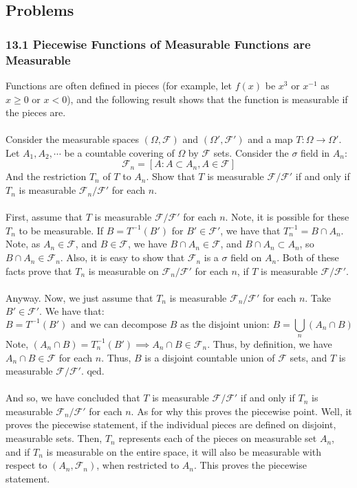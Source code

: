 \documentclass[12pt,a4paper]{article}
\newcommand{\1}[1]{\mathbbm{1}\left\{ #1 \right\}}
\newcommand{\fcal}{\mathcal{F}}
\begin{document}
\subsection{Problems}
\subsubsection{13.1 Piecewise Functions of Measurable Functions are Measurable} Functions are often defined in pieces (for example, let $f(x)$ be $x^3$ or $x^{-1}$ as $x \geq 0$ or $x < 0$), and the following result shows that the function is measurable if the pieces are.
\\\\
Consider the measurable spaces $(\Omega,\fcal)$ and $(\Omega',\fcal')$ and a map $T: \Omega \to \Omega'$. Let $A_1, A_2, \cdots$ be a countable covering of $\Omega$ by $\fcal$ sets. Consider the $\sigma$ field in $A_n$:
$$
	\fcal_n = \left[A : A \subset A_n, A \in \fcal\right]
$$
And the restriction $T_n$ of $T$ to $A_n$. Show that $T$ is measurable $\fcal/\fcal'$ if and only if $T_n$ is measurable $\fcal_n/\fcal'$ for each $n$.
\\\\
First, assume that $T$ is measurable $\fcal/\fcal'$ for each $n$. Note, it is possible for these $T_n$ to be measurable. If $B = T^{-1}(B')$ for $B' \in \fcal'$, we have that $T_n^{-1} = B \cap A_n$. Note, as $A_n \in \fcal$, and $B \in \fcal$, we have $B \cap A_n \in \fcal$, and $B \cap A_n \subset A_n$, so $B \cap A_n \in \fcal_n$. Also, it is easy to show that $\fcal_n$ is a $\sigma$ field on $A_n$. Both of these facts prove that $T_n$ is measurable on $\fcal_n/\fcal'$ for each $n$, if $T$ is measurable $\fcal/\fcal'$. 
\\\\
Anyway. Now, we just assume that $T_n$ is measurable $\fcal_n/\fcal'$ for each $n$. Take $B' \in \fcal'$. We have that:
$$
	B = T^{-1}(B') \text{ and we can decompose $B$ as the disjoint union: }
	B = \bigcup_n (A_n \cap B)
$$
Note, $(A_n \cap B) = T_n^{-1}(B') \implies A_n \cap B \in \fcal_n$. Thus, by definition, we have $A_n \cap B \in \fcal$ for each $n$. Thus, $B$ is a disjoint countable union of $\fcal$ sets, and $T$ is measurable $\fcal/\fcal'$. qed.
\\\\
And so, we have concluded that $T$ is measurable $\fcal/\fcal'$ if and only if $T_n$ is measurable $\fcal_n/\fcal'$ for each $n$. As for why this proves the piecewise point. Well, it proves the piecewise statement, if the individual pieces are defined on disjoint, measurable sets. Then, $T_n$ represents each of the pieces on measurable set $A_n$, and if $T_n$ is measurable on the entire space, it will also be measurable with respect to $(A_n,\fcal_n)$, when restricted to $A_n$. This proves the piecewise statement.
\end{document}
